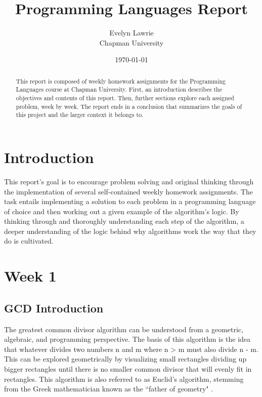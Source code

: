 \documentclass{article}
\title{Programming Languages Report}
\author{Evelyn Lawrie\\ Chapman University}
\date{\today}
\theoremstyle{theorem}
\theoremstyle{definition}
\theoremstyle{remark}
\begin{document}
\maketitle

\begin{abstract}
This report is composed of weekly homework assignments for the Programming Languages course at Chapman University. First, an introduction describes the objectives and contents of this report. Then, further sections explore each assigned problem, week by week. The report ends in a conclusion that summarizes the goals of this project and the larger context it belongs to. 
\end{abstract}

\tableofcontents

\section{Introduction}\label{intro}

This report's goal is to encourage problem solving and original thinking through the implementation of several self-contained weekly homework assignments. The task entails implementing a solution to each problem in a programming language of choice and then working out a given example of the algorithm's logic. By thinking through and thoroughly understanding each step of the algorithm, a deeper understanding of the logic behind why algorithms work the way that they do is cultivated. 

\section{Week 1}

\subsection{GCD Introduction}

The greatest common divisor algorithm can be understood from a geometric, algebraic, and programming perspective. The basis of this algorithm is the idea that whatever divides two numbers n and m where n \textgreater \text{} m must also divide n - m. This can be explored geometrically by visualizing small rectangles dividing up bigger rectangles until there is no smaller common divisor that will evenly fit in rectangles. This algorithm is also referred to as Euclid's algorithm, stemming from the Greek mathematician known as the ``father of geometry" \cite{Gcd}.
\end{document}
